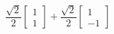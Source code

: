 \documentclass[preview]{standalone}
\begin{document}
\begin{center}
$\dfrac{\sqrt{2}}{2} \begin{bmatrix} 1 \\ 1\end{bmatrix} + \dfrac{\sqrt{2}}{2} \begin{bmatrix} 1 \\ -1\end{bmatrix}$
\end{center}
\end{document}
